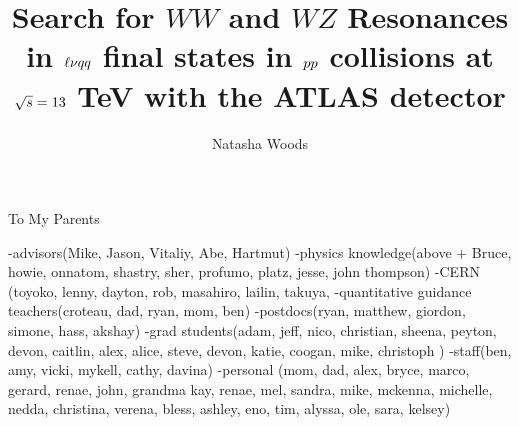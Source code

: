 





\title{Search for $WW$ and $WZ$ Resonances in $\ell\nu \MakeLowercase{qq}$ final states in $\MakeLowercase{pp}$ collisions at $\sqrt{\MakeLowercase{s}}=13$ TeV with the ATLAS detector}
\author{Natasha Woods}
\deanlinethree{}

\begin{frontmatter}
\maketitle

\copyrightpage

\tableofcontents


\listoffigures

\listoftables
\begin{abstract}

\end{abstract}

\begin{dedication}
\vspace*{\fill}
\begin{center}
To My Parents
\end{center}
\vspace*{\fill}
\end{dedication}

\begin{acknowledgements}
-advisors(Mike, Jason, Vitaliy, Abe, Hartmut)
-physics knowledge(above + Bruce, howie, onnatom, shastry, sher, profumo, platz, jesse, john thompson)
-CERN (toyoko, lenny, dayton, rob, masahiro, lailin, takuya, 
-quantitative guidance teachers(croteau, dad, ryan, mom, ben)
-postdocs(ryan, matthew, giordon, simone, hass, akshay)
-grad students(adam, jeff, nico, christian, sheena, peyton, devon, caitlin, alex, alice, steve, devon, katie, coogan, mike, christoph  )
-staff(ben, amy, vicki, mykell, cathy, davina)
-personal (mom, dad, alex, bryce, marco, gerard, renae, john, grandma kay, renae, mel, sandra, mike, mckenna, michelle, nedda, christina, verena, bless, ashley, eno, tim, alyssa, ole, sara, kelsey)

\end{acknowledgements}

\end{frontmatter}
\linenumbers
